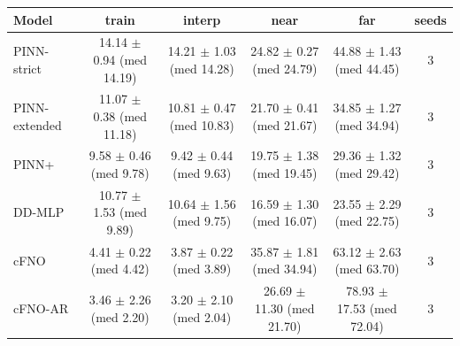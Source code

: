 \begin{tabular}{lccccc}
\toprule
Model & train & interp & near & far & seeds \\
\midrule
PINN-strict & 14.14 $\pm$ 0.94 (med 14.19) & 14.21 $\pm$ 1.03 (med 14.28) & 24.82 $\pm$ 0.27 (med 24.79) & 44.88 $\pm$ 1.43 (med 44.45) & 3 \\
PINN-extended & 11.07 $\pm$ 0.38 (med 11.18) & 10.81 $\pm$ 0.47 (med 10.83) & 21.70 $\pm$ 0.41 (med 21.67) & 34.85 $\pm$ 1.27 (med 34.94) & 3 \\
PINN+ & 9.58 $\pm$ 0.46 (med 9.78) & 9.42 $\pm$ 0.44 (med 9.63) & 19.75 $\pm$ 1.38 (med 19.45) & 29.36 $\pm$ 1.32 (med 29.42) & 3 \\
DD-MLP & 10.77 $\pm$ 1.53 (med 9.89) & 10.64 $\pm$ 1.56 (med 9.75) & 16.59 $\pm$ 1.30 (med 16.07) & 23.55 $\pm$ 2.29 (med 22.75) & 3 \\
cFNO & 4.41 $\pm$ 0.22 (med 4.42) & 3.87 $\pm$ 0.22 (med 3.89) & 35.87 $\pm$ 1.81 (med 34.94) & 63.12 $\pm$ 2.63 (med 63.70) & 3 \\
cFNO-AR & 3.46 $\pm$ 2.26 (med 2.20) & 3.20 $\pm$ 2.10 (med 2.04) & 26.69 $\pm$ 11.30 (med 21.70) & 78.93 $\pm$ 17.53 (med 72.04) & 3 \\
\bottomrule
\end{tabular}
